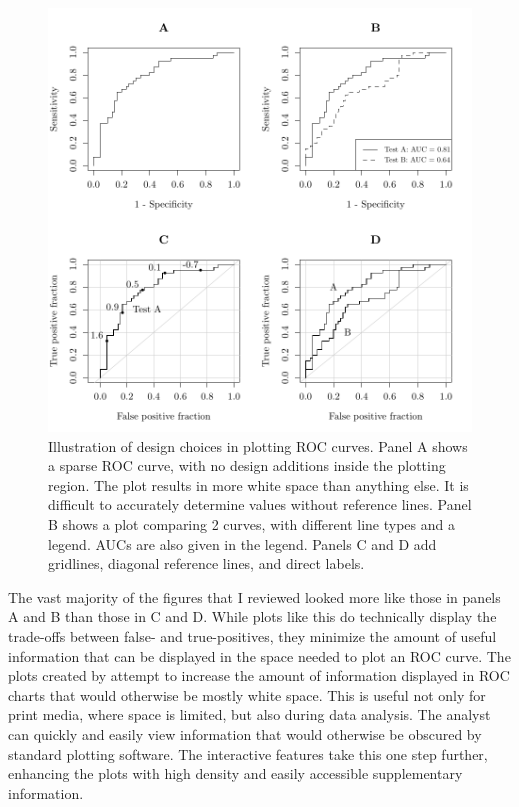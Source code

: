 \documentclass[codesnippet]{jss}
\begin{document}
\begin{Schunk}
\begin{figure}
\includegraphics{figure/figure1-1} \caption[Illustration of design choices in plotting ROC curves]{Illustration of design choices in plotting ROC curves. Panel A shows a sparse ROC curve, with no design additions inside the plotting region. The plot results in more white space than anything else. It is difficult to accurately determine values without reference lines. Panel B shows a plot comparing 2 curves, with different line types and a legend. AUCs are also given in the legend. Panels C and D add gridlines, diagonal reference lines, and direct labels. \label{figure1}}\label{fig:figure1}
\end{figure}
\end{Schunk}

The vast majority of the figures that I reviewed looked more like those
in panels A and B than those in C and D. While plots like this do
technically display the trade-offs between false- and true-positives,
they minimize the amount of useful information that can be displayed in
the space needed to plot an ROC curve. The plots created by
 attempt to increase the amount of information displayed in
ROC charts that would otherwise be mostly white space. This is useful
not only for print media, where space is limited, but also during data
analysis. The analyst can quickly and easily view information that would
otherwise be obscured by standard plotting software. The interactive
features take this one step further, enhancing the plots with high
density and easily accessible supplementary information.
\end{document}
